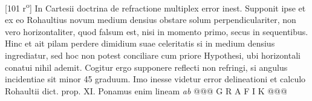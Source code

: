                 \vspace*{8mm}
                \pstart 
                \normalsize
            [101 r\textsuperscript{o}]  In Cartesii\protect{} doctrina de refractione\protect{} multiplex error inest. Supponit ipse et ex eo Rohaultius\protect{} novum medium densius obstare solum perpendiculariter, non vero horizontaliter, quod falsum est, nisi in momento primo, secus in sequentibus. Hinc et  ait pilam perdere dimidium suae celeritatis\protect{} si in medium  densius ingrediatur, sed hoc non potest conciliare cum priore Hypothesi, ubi horizontali conatui nihil ademit. Cogitur ergo supponere  reflecti non refringi, si angulus incidentiae\protect{} sit minor 45 graduum. Imo inesse videtur error delineationi et calculo Rohaultii\protect{} dict. prop. XI. Ponamus enim lineam \textit{ab} @@@ G R A F I K @@@%
